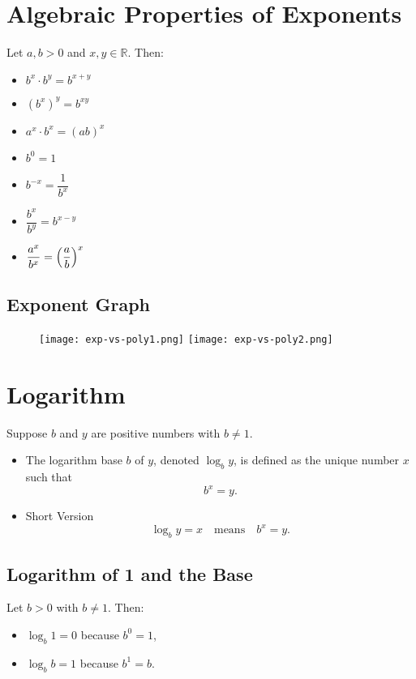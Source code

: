 \section{Algebraic Properties of Exponents}
Let \(a, b > 0\) and \(x, y \in \mathbb{R}\). Then:
\begin{itemize}
  \item \(b^x \cdot b^y = b^{x+y}\)
  \item \((b^x)^y = b^{xy}\)
  \item \(a^x \cdot b^x = (ab)^x\)
  \item \(b^0 = 1\)
  \item \(b^{-x} = \dfrac{1}{b^x}\)
  \item \(\dfrac{b^x}{b^y} = b^{x-y}\)
  \item \(\dfrac{a^x}{b^x} = \Bigl(\dfrac{a}{b}\Bigr)^x\)
\end{itemize}

\subsection{Exponent Graph}
\begin{figure}
\centering
\texttt{[image: exp-vs-poly1.png]}
\texttt{[image: exp-vs-poly2.png]}
\end{figure}

\section{Logarithm}
Suppose \(b\) and \(y\) are positive numbers with \(b\neq 1\).
\begin{itemize}
  \item The logarithm base \(b\) of \(y\), denoted \(\log_b y\), is defined as the unique number \(x\) such that
  \[ b^x = y. \]
  \item  Short Version
  \[ \log_b y = x \quad \text{means} \quad b^x = y. \]
\end{itemize}

\subsection{Logarithm of 1 and the Base}
Let \(b>0\) with \(b\neq 1\). Then:
\begin{itemize}
  \item \(\log_b 1 = 0\) because \(b^0 = 1\),
  \item \(\log_b b = 1\) because \(b^1 = b\).
\end{itemize}

